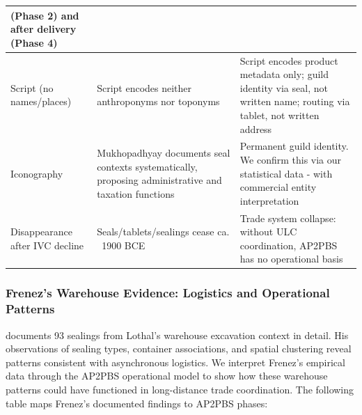 \documentclass[12pt]{article}
\begin{document}
\begin{table}[htbp]
\begin{tabular}{@{}p{3.4cm}p{4.8cm}p{6.8cm}@{}}
(Phase 2) and after delivery (Phase 4) \\
\midrule
Script (no names/places) & Script encodes neither anthroponyms nor toponyms
& Script encodes product metadata only; guild identity via seal, not written
name; routing via tablet, not written address \\
\midrule
Iconography & Mukhopadhyay documents seal contexts systematically, proposing administrative and taxation functions & Permanent
guild identity. We confirm this via our statistical data - with commercial
entity interpretation \\
\midrule
Disappearance after IVC decline & Seals/tablets/sealings cease ca. \ 1900 BCE
& Trade system collapse: without ULC coordination, AP2PBS has no operational
basis \\
\bottomrule
\end{tabular}
\end{table}

\FloatBarrier

\subsubsection{Frenez's Warehouse Evidence: Logistics and Operational Patterns}

\citet{frenez2005lothal} documents 93 sealings from Lothal's warehouse excavation
context in detail.  His observations of sealing types, container associations,
and spatial clustering reveal patterns consistent with asynchronous logistics.
We interpret Frenez's empirical data through the AP2PBS operational model to
show how these warehouse patterns could have functioned in long-distance
trade coordination. The following table maps Frenez's documented findings to
AP2PBS phases:
\end{document}
